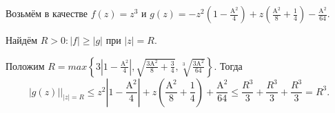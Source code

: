 Возьмём в качестве $f(z) = z^3$ и $g(z) = - z ^2 \left( 1 -\frac{\text{A}^2 }{4}\right)+z \left(\frac{\text{A}^2 }{8}+\frac{1}{4}\right)-\frac{\text{A}^2}{64}$. 

Найдём $R>0\colon |f|\ge |g|$ при $|z| = R$.

Положим $R =max\left\{ 3\left| 1 -\frac{\text{A}^2 }{4}\right|,\sqrt{\frac{\text{3A}^2 }{8}+\frac{3}{4}},\sqrt[3]{\frac{\text{3A}^2}{64}} \right\}$. Тогда
\[
  \big|g(z)\big|\bigg|_{|z| = R}\le 
 z ^2 \left| 1 -\frac{\text{A}^2 }{4}\right|+z \left(\frac{\text{A}^2 }{8}+\frac{1}{4}\right)+\frac{\text{A}^2}{64}
  \le \frac{R^3}3 + \frac{R^3}3 + \frac{R^3}3 = R^3 .
\]



